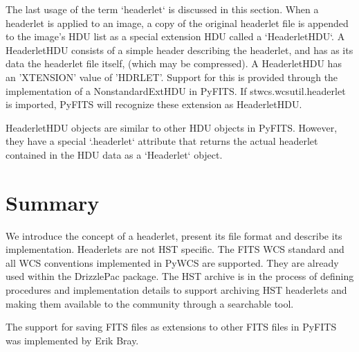 The last usage of the term `headerlet` is discussed in this section. When a headerlet is applied to an image, a copy of the original headerlet file is appended to the image's HDU list as a special extension HDU called a `HeaderletHDU`. A HeaderletHDU consists of a simple header describing the headerlet, and has as its data the headerlet file itself, (which may be compressed). A HeaderletHDU has an 'XTENSION' value of 'HDRLET'. Support for this is provided through the implementation of a NonstandardExtHDU in PyFITS. If stwcs.wcsutil.headerlet is imported, PyFITS will recognize these extension as HeaderletHDU.

HeaderletHDU objects are similar to other HDU objects in PyFITS. However, they have a special `.headerlet` attribute that returns the actual headerlet contained in the HDU data as a `Headerlet` object.

\section{Summary}
We introduce the concept of a headerlet, present its file format and describe its implementation. Headerlets are not HST specific. The FITS WCS standard and all WCS conventions implemented in PyWCS are supported. They are already used within the DrizzlePac package. The HST archive is in the process of defining procedures and implementation details to support archiving HST headerlets and making them available to the community through a searchable tool.

\acknowledgements The support for saving FITS files as extensions to other FITS files in PyFITS was implemented by Erik Bray.


 
